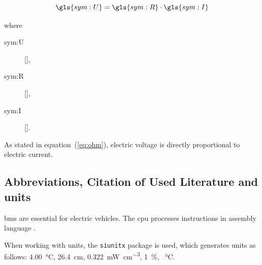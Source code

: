 \begin{equation} 
	\gls{sym:U} = \gls{sym:R} \cdot \gls{sym:I} 
	\label{eq:ohm} 
\end{equation} 

where

\begin{description}
	\item[\gls{sym:U}]  [],
	\item[\gls{sym:R}]  [],
	\item[\gls{sym:I}]  [].
\end{description}

As stated in equation~(\ref{eq:ohm}), electric voltage is directly proportional to electric current.

\subsection{Abbreviations, Citation of Used Literature and units}

\gls{bms} are essential for electric vehicles. The \gls{cpu} processes instructions in assembly language \cite{nuclearfissionuranium235, JAYABAL2024103121}.

When working with units, the \texttt{siunitx} package is used, which generates units as follows: \SI{4.00}{\celsius}, \SI{26.4}{\centi\metre}, \SI{0.322}{\milli\watt\per\cubic\centi\metre}, \SI{1}{\percent}, \SI{}{\celsius}.
